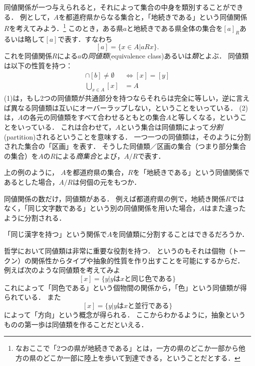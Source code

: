 \documentclass[11pt,a4paper]{jsarticle} %
\begin{document}
同値関係が一つ与えられると，それによって集合の中身を類別することができる．
例として，$A$を都道府県からなる集合と，「地続きである」という同値関係$R$を考えてみよう．\footnote{なおここで「2つの県が地続きである」とは，一方の県のどこか一部から他方の県のどこか一部に陸上を歩いて到達できる，ということだとする．}
このとき，ある県$a$と地続きである県全体の集合を$[a]_R$あるいは略して$[a]$で表す．すなわち
\[
 [a] = \{x \in A | aRx\}.
\]
これを同値関係$R$による$a$の\emph{同値類}(equivalence class)あるいは\emph{類}とよぶ．
同値類は以下の性質を持つ：
\begin{align}
[a] \cap [b] \neq \emptyset & \iff [x] = [y] \\
\bigcup_{x \in A} [x] & = A
\end{align}
(1)は，もし2つの同値類が共通部分を持つならそれらは完全に等しい，逆に言えば異なる同値類は互いにオーバーラップしない，ということをいっている．
(2)は，$A$の各元の同値類をすべて合わせるともとの集合$A$と等しくなる，ということをいっている．
これは合わせて，$A$という集合は同値類によって\emph{分割}(partition)されるということを意味する．
一つ一つの同値類は，そのように分割された集合の「区画」を表す．
そうした同値類／区画の集合（つまり部分集合の集合）を$A$の$R$による\emph{商集合}とよび，$A/R$で表す．

\begin{exercise}
上の例のように， $A$を都道府県の集合，$R$を「地続きである」という同値関係であるとした場合，$A/R$は何個の元をもつか．
\end{exercise}

同値関係の数だけ，同値類がある．
例えば都道府県の例で，地続き関係$R$ではなく，「同じ文字数である」という別の同値関係を用いた場合，$A$はまた違ったように分割される．

\begin{exercise}
「同じ漢字を持つ」という関係で$A$を同値類に分割することはできるだろうか．
\end{exercise}

\begin{example}
哲学において同値類は非常に重要な役割を持つ．
というのもそれは個物（トークン）の関係性からタイプや抽象的性質を作り出すことを可能にするからだ．
例えば次のような同値類を考えてみよ
\[
 [x] = \{ y | y \text{は} x \text{と同じ色である}\}
\]
これによって「同色である」という個物間の関係から，「色」という同値類が得られている．
また
\[
 [x] = \{ y | y \text{は} x \text{と並行である}\}
\]
によって「方向」という概念が得られる．
ここからわかるように，抽象というものの第一歩は同値類を作ることだといえる．
\end{example}
\end{document}
